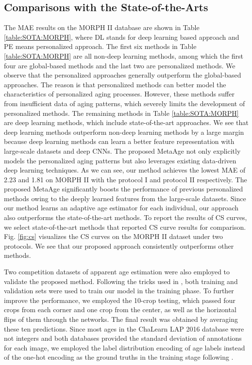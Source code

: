 \documentclass[journal,twoside]{IEEEtran}
\begin{document}
\subsection{Comparisons with the State-of-the-Arts}


The MAE results on the MORPH II database are shown in Table \ref{table:SOTA:MORPH}, where DL stands for deep learning based approach and PE means personalized approach. The first six methods in Table \ref{table:SOTA:MORPH} are all non-deep learning methods, among which the first four are global-based methods and the last two are personalized methods. We observe that the personalized approaches generally outperform the global-based approaches. The reason is that personalized methods can better model the characteristics of personalized aging processes. However, these methods suffer from insufficient data of aging patterns, which severely limits the development of personalized methods. The remaining methods in Table \ref{table:SOTA:MORPH} are deep learning methods, which include state-of-the-art approaches. We see that deep learning methods outperform non-deep learning methods by a large margin because deep learning methods can learn a better feature representation with large-scale datasets and deep CNNs. The proposed MetaAge not only explicitly models the personalized aging patterns but also leverages existing data-driven deep learning techniques. As we can see, our method achieves the lowest MAE of 2.23 and 1.81 on MORPH II with the protocol I and protocol II respectively.  The proposed MetaAge significantly boosts the performance of previous personalized methods owing to the deeply learned features from the large-scale datasets. Since our method learns an adaptive age estimator for each individual, our approach also outperforms the state-of-the-art methods. To report the results of CS curves, we select state-of-the-art methods that reported CS curve results for comparison.
Fig. \ref{fig:cs} visualizes the CS curves on the MORPH II dataset under two protocols. We see that our proposed approach consistently outperforms other methods.





Two competition datasets of apparent age estimation were also employed to validate the proposed method. Following the tricks used in \cite{rothe2018deep,tan2017efficient,li2019bridgenet}, both training and validation sets were used to train our model in the training phase. To further improve the performance, we employed the 10-crop testing, which passed four crops from each corner and one crop from the center, as well as the horizontal flips of them through the networks. The final result was obtained by averaging these ten predictions. Since most ages in the ChaLearn LAP 2016 database were not integers and both databases provided the standard deviation  of annotations for each image, we employed the label distribution encoding of age labels instead of the one-hot encoding as the ground truths in the training stage following \cite{antipov2016apparent,liu2015agenet}.
\end{document}
